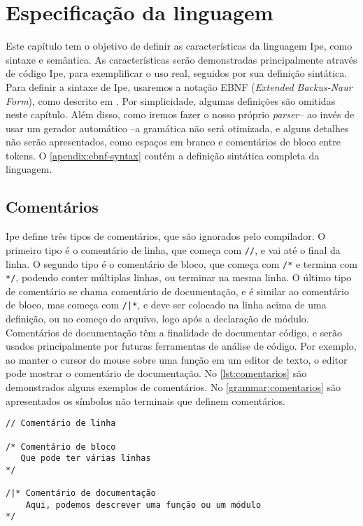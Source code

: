 
\chapter{Especificação da linguagem}\label{chapter:specification}

Este capítulo tem o objetivo de definir as características da linguagem Ipe, como
sintaxe e semântica. As características serão demonstradas principalmente através
de código Ipe, para exemplificar o uso real, seguidos por sua definição sintática.
Para definir a sintaxe de Ipe, usaremos a notação EBNF (\textit{Extended Backus-Naur Form}),
como descrito em \cite{ebnfstandard}. Por simplicidade, algumas definições são
omitidas neste capítulo. Além disso, como iremos fazer o nosso próprio
\textit{parser}-- ao invés de usar um gerador automático --a gramática não será
otimizada, e alguns detalhes não serão apresentados, como espaços em branco
e comentários de bloco entre tokens. O \autoref{apendix:ebnf-syntax} contém a
definição sintática completa da linguagem.

\section{Comentários}

Ipe define três tipos de comentários, que são ignorados pelo compilador. O primeiro
tipo é o comentário de linha, que começa com \texttt{//}, e vai até o final da linha.
O segundo tipo é o comentário de bloco, que começa com \texttt{/*} e termina com
\texttt{*/}, podendo conter múltiplas linhas, ou terminar na mesma linha. O último
tipo de comentário se chama comentário de documentação, e é similar ao comentário
de bloco, mas começa com \texttt{/|*}, e deve ser colocado na linha acima de uma
definição, ou no começo do arquivo, logo após a declaração de módulo. Comentários
de documentação têm a finalidade de documentar código, e serão usados principalmente por
futuras ferramentas de análise de código. Por exemplo, ao manter o cursor do
mouse sobre uma função em um editor de texto, o editor pode mostrar o comentário
de documentação. No \autoref{lst:comentarios} são demonstrados alguns exemplos
de comentários. No \autoref{grammar:comentarios} são apresentados os símbolos
não terminais que definem comentários.

\begin{lstlisting}[label={lst:comentarios},caption={Exemplos de comentários}]
// Comentário de linha

/* Comentário de bloco
   Que pode ter várias linhas
*/

/|* Comentário de documentação
    Aqui, podemos descrever uma função ou um módulo 
*/
\end{lstlisting}

